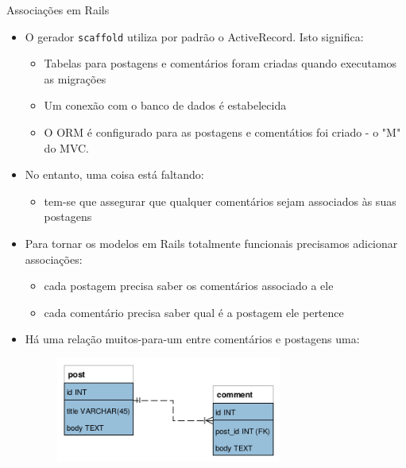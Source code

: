 \begin{frame}{Associações em Rails}
	\begin{itemize}
		\item O gerador \verb|scaffold| utiliza por padrão o ActiveRecord. Isto significa:
		\begin{itemize}
			\item Tabelas para postagens e comentários foram criadas quando executamos as migrações
			\item Um conexão com o banco de dados é estabelecida
			\item O ORM é configurado para as postagens e comentátios foi criado - o "M" do
			MVC.
		\end{itemize}

		\item No entanto, uma coisa está faltando:
		\begin{itemize}
			\item  \alert{tem-se que assegurar que qualquer
				comentários sejam associados às suas postagens}
		\end{itemize}

		\item Para tornar os modelos em Rails totalmente funcionais precisamos adicionar
		\alert{associações}:
		\begin{itemize}
			\item cada postagem precisa saber os comentários associado a ele
			\item cada comentário precisa saber qual é a postagem ele pertence
		\end{itemize}
	
		\item Há uma relação \alert{muitos-para-um} entre comentários e postagens
		uma:
		\begin{figure}[h!]
			\centering
			\includegraphics[width=0.70\textwidth]{imagens/modelo-de-dados-blog.png}
		\end{figure}
		

\end{itemize}
\end{frame}
